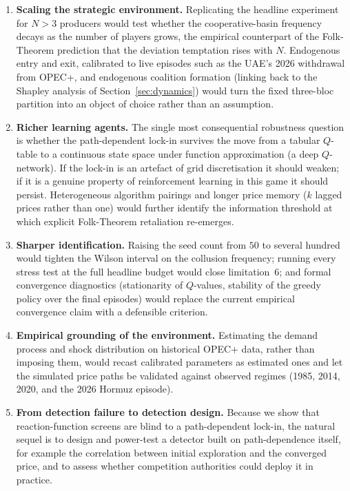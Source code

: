 \begin{enumerate}\itemsep3pt

  \item \textbf{Scaling the strategic environment.}
        Replicating the headline experiment for $N>3$ producers
        would test whether the cooperative-basin frequency
        decays as the number of players grows, the
        empirical counterpart of the Folk-Theorem prediction that
        the deviation temptation rises with $N$. Endogenous entry
        and exit, calibrated to live episodes such as the UAE's
        2026 withdrawal from OPEC+, and endogenous coalition
        formation (linking back to the Shapley analysis of
        Section~\ref{sec:dynamics}) would turn the fixed three-bloc partition into
        an object of choice rather than an assumption.

  \item \textbf{Richer learning agents.}
        The single most consequential robustness question is
        whether the path-dependent lock-in survives the move from
        a tabular $Q$-table to a continuous state space under
        function approximation (a deep $Q$-network). If the
        lock-in is an artefact of grid discretisation it should
        weaken; if it is a genuine property of reinforcement
        learning in this game it should persist. Heterogeneous
        algorithm pairings and longer price memory ($k$ lagged
        prices rather than one) would further identify the
        information threshold at which explicit Folk-Theorem
        retaliation re-emerges.

  \item \textbf{Sharper identification.}
        Raising the seed count from $50$ to several hundred would
        tighten the Wilson interval on the collusion frequency;
        running every stress test at the full headline budget
        would close limitation~6; and formal convergence
        diagnostics (stationarity of $Q$-values, stability of the
        greedy policy over the final episodes) would replace the
        current empirical convergence claim with a defensible
        criterion.

  \item \textbf{Empirical grounding of the environment.}
        Estimating the demand process and shock distribution on
        historical OPEC+ data, rather than imposing them, would
        recast calibrated parameters as estimated ones and let the
        simulated price paths be validated against observed
        regimes (1985, 2014, 2020, and the 2026 Hormuz episode).

  \item \textbf{From detection failure to detection design.}
        Because we show that reaction-function screens are blind
        to a path-dependent lock-in, the natural sequel is to
        design and power-test a detector built on path-dependence
        itself, for example the correlation between initial
        exploration and the converged price, and to assess whether
        competition authorities could deploy it in practice.

\end{enumerate}


